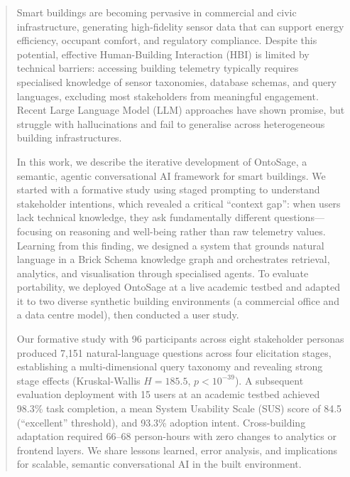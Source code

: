 \documentclass[acmsmall]{acmart}
\begin{document}
\begin{abstract}
Smart buildings are becoming pervasive in commercial and civic infrastructure, generating high-fidelity sensor data that can support energy efficiency, occupant comfort, and regulatory compliance. Despite this potential, effective Human-Building Interaction (HBI) is limited by technical barriers: accessing building telemetry typically requires specialised knowledge of sensor taxonomies, database schemas, and query languages, excluding most stakeholders from meaningful engagement. Recent Large Language Model (LLM) approaches have shown promise, but struggle with hallucinations and fail to generalise across heterogeneous building infrastructures.

In this work, we describe the iterative development of OntoSage, a semantic, agentic conversational AI framework for smart buildings. We started with a formative study using staged prompting to understand stakeholder intentions, which revealed a critical ``context gap'': when users lack technical knowledge, they ask fundamentally different questions---focusing on reasoning and well-being rather than raw telemetry values. Learning from this finding, we designed a system that grounds natural language in a Brick Schema knowledge graph and orchestrates retrieval, analytics, and visualisation through specialised agents. To evaluate portability, we deployed OntoSage at a live academic testbed and adapted it to two diverse synthetic building environments (a commercial office and a data centre model), then conducted a user study.

Our formative study with 96 participants across eight stakeholder personas produced 7{,}151 natural-language questions across four elicitation stages, establishing a multi-dimensional query taxonomy and revealing strong stage effects (Kruskal-Wallis $H=185.5$, $p < 10^{-39}$). A subsequent evaluation deployment with 15 users at an academic testbed achieved 98.3\% task completion, a mean System Usability Scale (SUS) score of 84.5 (``excellent'' threshold), and 93.3\% adoption intent. Cross-building adaptation required 66--68 person-hours with zero changes to analytics or frontend layers. We share lessons learned, error analysis, and implications for scalable, semantic conversational AI in the built environment.
\end{abstract}
\end{document}
